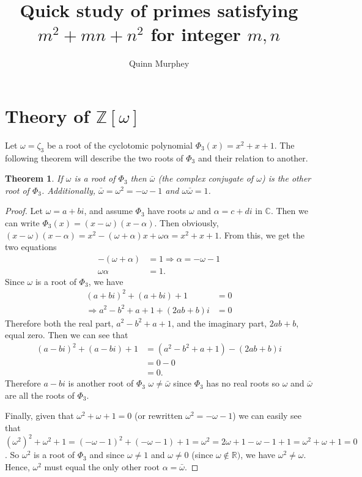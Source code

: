 \documentclass[12pt]{amsart}
\newtheorem{theorem}{Theorem}
\theoremstyle{definition}
\theoremstyle{remark}
\begin{document}
 
\renewcommand{\qedsymbol}{$\square$}
 
\title{Quick study of primes satisfying $m^2+mn+n^2$ for integer $m,n$}
\author{Quinn Murphey}
\maketitle

\section*{Theory of $\mathbb{Z}[\omega]$}

Let $\omega=\zeta_3$ be a root of the cyclotomic polynomial $\Phi_3(x)=x^2+x+1$. The following theorem will describe the two roots of $\Phi_3$ and their relation to another.
\begin{theorem}\label{Thm:RootProperties}
    If $\omega$ is a root of $\Phi_3$ then $\bar{\omega}$ (the complex conjugate of $\omega$) is the other root of $\Phi_3$. Additionally, $\bar{\omega}=\omega^2=-\omega-1$ and $\omega\bar{\omega}=1$.
\end{theorem}
\begin{proof}
    Let $\omega=a+bi$, and assume $\Phi_3$ have roots $\omega$ and $\alpha=c+di$ in $\mathbb{C}$. Then we can write $\Phi_3(x)=(x-\omega)(x-\alpha)$. Then obviously, $(x-\omega)(x-\alpha)=x^2-(\omega+\alpha)x+\omega\alpha=x^2+x+1$. From this, we get the two equations
    \begin{align*}
        -(\omega+\alpha)&=1\Rightarrow \alpha = -\omega-1\\
        \omega\alpha&=1.
    \end{align*} 
    Since $\omega$ is a root of $\Phi_3$, we have
    \begin{align*}
        (a+bi)^2+(a+bi)+1&=0\\
        \Rightarrow a^2-b^2+a+1 + (2ab+b)i &= 0
    \end{align*}
    Therefore both the real part, $a^2-b^2+a+1$, and the imaginary part, $2ab+b$, equal zero.
    Then we can see that 
    \begin{align*}
        (a-bi)^2 + (a-bi) + 1 &= (a^2-b^2+a+1) - (2ab+b)i\\
        &= 0 - 0\\
        &= 0.
    \end{align*}
    Therefore $a-bi$ is another root of $\Phi_3$ $\omega\not=\bar{\omega}$ since $\Phi_3$ has no real roots so $\omega$ and $\bar{\omega}$ are all the roots of $\Phi_3$.
    
    Finally, given that $\omega^2+\omega+1=0$ (or rewritten $\omega^2=-\omega-1$) we can easily see that $(\omega^2)^2+\omega^2+1=(-\omega-1)^2+(-\omega-1)+1=\omega^2=2\omega+1-\omega-1+1=\omega^2+\omega+1=0$. So $\omega^2$ is a root of $\Phi_3$ and since $\omega \not=1$ and $\omega\not=0$ (since $\omega\not\in\mathbb{R})$, we have $\omega^2\not=\omega$. Hence, $\omega^2$ must equal the only other root $\alpha=\bar{\omega}$.
\end{proof}
\end{document}

